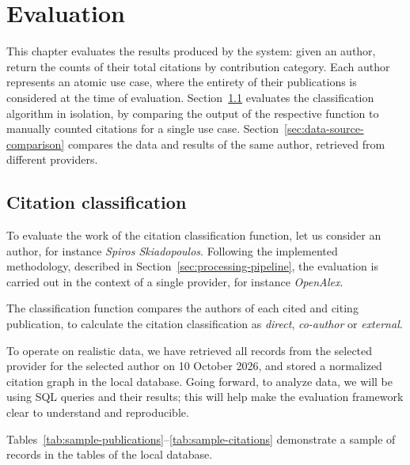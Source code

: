 
\chapter{Evaluation} \label{c4:evaluation}

This chapter evaluates the results produced by the system: given an author, return the counts of their total citations by contribution category.
Each author represents an atomic use case, where the entirety of their publications is considered at the time of evaluation.
Section~\ref{sec:classification-checks} evaluates the classification algorithm in isolation, by comparing the output of the respective function to manually counted citations for a single use case.
Section~\ref{sec:data-source-comparison} compares the data and results of the same author, retrieved from different providers.

\section{Citation classification} \label{sec:classification-checks}

To evaluate the work of the citation classification function, let us consider an author, for instance \emph{Spiros Skiadopoulos}.
Following the implemented methodology, described in Section~\ref{sec:processing-pipeline}, the evaluation is carried out in the context of a single provider, for instance \emph{OpenAlex}.

The classification function compares the authors of each cited and citing publication, to calculate the citation classification as \emph{direct}, \emph{co-author} or \emph{external}.

To operate on realistic data, we have retrieved all records from the selected provider for the selected author on 10 October 2026, and stored a normalized citation graph in the local database.
Going forward, to analyze data, we will be using SQL queries and their results; this will help make the evaluation framework clear to understand and reproducible.

Tables~\ref{tab:sample-publications}--\ref{tab:sample-citations} demonstrate a sample of records in the tables of the local database.


